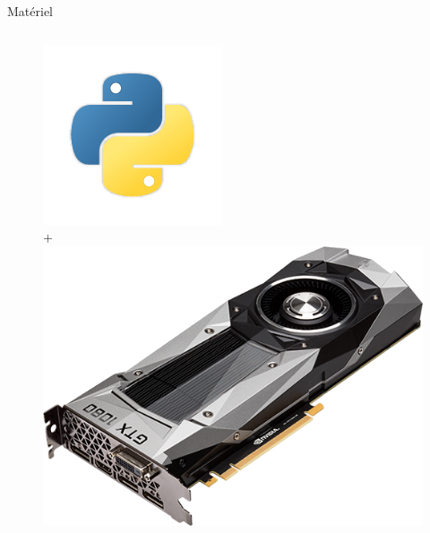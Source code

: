 \documentclass{beamer}
\begin{document}
\begin{frame}{Matériel}
\begin{columns}
\begin{column}{0.20\textwidth}
\begin{figure}
\includegraphics[width=\textwidth]{python}\\
\Huge{$+$}\\
\vspace{1em}
\includegraphics[width=\textwidth]{gpu}
\end{figure}
\end{column}

\end{columns}

\end{frame}
\end{document}
